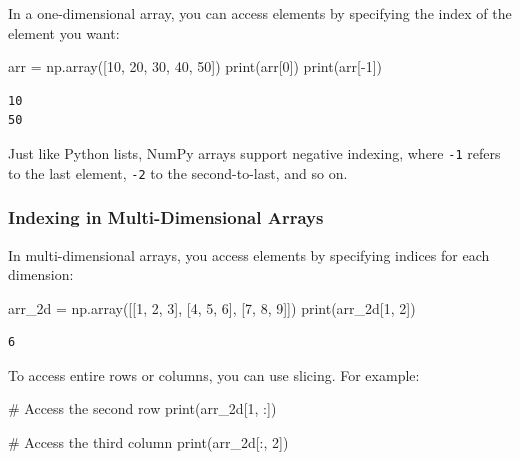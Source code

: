 \documentclass[
  letterpaper,
  DIV=11,
  numbers=noendperiod]{scrreprt}
\newenvironment{Shaded}{\begin{snugshade}}{\end{snugshade}}
\newcommand{\BuiltInTok}[1]{\textcolor[rgb]{0.00,0.23,0.31}{#1}}
\newcommand{\CommentTok}[1]{\textcolor[rgb]{0.37,0.37,0.37}{#1}}
\newcommand{\DecValTok}[1]{\textcolor[rgb]{0.68,0.00,0.00}{#1}}
\newcommand{\NormalTok}[1]{\textcolor[rgb]{0.00,0.23,0.31}{#1}}
\newcommand{\OperatorTok}[1]{\textcolor[rgb]{0.37,0.37,0.37}{#1}}
\begin{document}
In a one-dimensional array, you can access elements by specifying the
index of the element you want:

\begin{Shaded}
\begin{Highlighting}[]
\NormalTok{arr }\OperatorTok{=}\NormalTok{ np.array([}\DecValTok{10}\NormalTok{, }\DecValTok{20}\NormalTok{, }\DecValTok{30}\NormalTok{, }\DecValTok{40}\NormalTok{, }\DecValTok{50}\NormalTok{])}
\BuiltInTok{print}\NormalTok{(arr[}\DecValTok{0}\NormalTok{])}
\BuiltInTok{print}\NormalTok{(arr[}\OperatorTok{{-}}\DecValTok{1}\NormalTok{])  }
\end{Highlighting}
\end{Shaded}

\begin{verbatim}
10
50
\end{verbatim}

Just like Python lists, NumPy arrays support negative indexing, where
\texttt{-1} refers to the last element, \texttt{-2} to the
second-to-last, and so on.

\hypertarget{indexing-in-multi-dimensional-arrays}{%
\subsubsection{Indexing in Multi-Dimensional
Arrays}\label{indexing-in-multi-dimensional-arrays}}

In multi-dimensional arrays, you access elements by specifying indices
for each dimension:

\begin{Shaded}
\begin{Highlighting}[]
\NormalTok{arr\_2d }\OperatorTok{=}\NormalTok{ np.array([[}\DecValTok{1}\NormalTok{, }\DecValTok{2}\NormalTok{, }\DecValTok{3}\NormalTok{], [}\DecValTok{4}\NormalTok{, }\DecValTok{5}\NormalTok{, }\DecValTok{6}\NormalTok{], [}\DecValTok{7}\NormalTok{, }\DecValTok{8}\NormalTok{, }\DecValTok{9}\NormalTok{]])}
\BuiltInTok{print}\NormalTok{(arr\_2d[}\DecValTok{1}\NormalTok{, }\DecValTok{2}\NormalTok{]) }
\end{Highlighting}
\end{Shaded}

\begin{verbatim}
6
\end{verbatim}

To access entire rows or columns, you can use slicing. For example:

\begin{Shaded}
\begin{Highlighting}[]
\CommentTok{\# Access the second row}
\BuiltInTok{print}\NormalTok{(arr\_2d[}\DecValTok{1}\NormalTok{, :])  }

\CommentTok{\# Access the third column}
\BuiltInTok{print}\NormalTok{(arr\_2d[:, }\DecValTok{2}\NormalTok{]) }
\end{Highlighting}
\end{Shaded}
\end{document}

